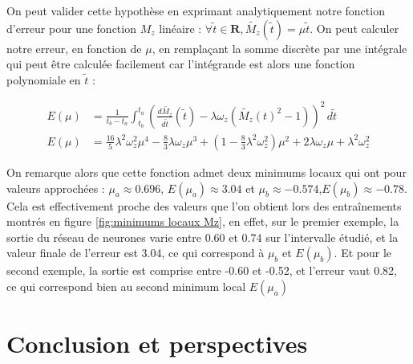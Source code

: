 \documentclass[12pt]{report}
\begin{document}
On peut valider cette hypothèse en exprimant analytiquement notre fonction d'erreur pour une fonction $M_z$ 
linéaire : $\forall \tilde{t} \in \mathbf{R}, \tilde{M_z}(\tilde{t}) = \mu  \tilde{t}$. On peut calculer notre erreur, 
en fonction de $\mu$, en remplaçant la somme discrète par une intégrale qui peut être calculée facilement car 
l'intégrande est alors une fonction polynomiale en $\tilde{t}$ :

\begin{equation}
    \begin{aligned}
        E(\mu) &= \frac{1}{t_b-t_a}\int_{t_b}^{t_a} (\frac{d\tilde{M_z}}{d\tilde{t}}(\tilde{t})-\lambda \omega_z (\tilde{M_z}(t)^2-1))^2 \,d \tilde{t} \\
        E(\mu) &= \frac{16}{5}\lambda^2\omega_z^2\mu^4 
            - \frac{8}{3}\lambda\omega_z\mu^3
            + (1- \frac{8}{3}\lambda^2\omega_z^2)\mu^2
            + 2\lambda\omega_z\mu
            + \lambda^2\omega_z^2
    \end{aligned}
    \label{eq:fonction d'erreur analytique, M_z linéaire}
\end{equation}

On remarque alors que cette fonction admet deux minimums locaux qui ont pour valeurs
approchées : $ \mu_a \approx 0.696$, $E(\mu_a) \approx 3.04$ et 
$\mu_b \approx -0.574$,$ E(\mu_b) \approx -0.78$. 
Cela est effectivement proche des valeurs que l'on obtient lors des 
entraînements montrés en figure \ref{fig:minimums locaux Mz}, en effet, sur le premier exemple,
la sortie du réseau de neurones varie entre 0.60 et 0.74 sur l'intervalle étudié, et
la valeur finale de l'erreur est 3.04, ce qui correspond à $\mu_b$ et $E(\mu_b)$.
Et pour le second exemple, la sortie est comprise entre -0.60 et -0.52, et l'erreur 
vaut 0.82, 
ce qui correspond bien au second minimum local $E(\mu_a)$


\chapter{Conclusion et perspectives}
\label{Conclusion}

\begin{thebibliography}{2}
\end{thebibliography}
\end{document}
